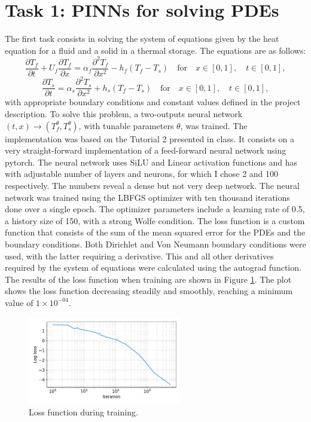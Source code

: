 \documentclass[unicode,11pt,a4paper,oneside,numbers=endperiod,openany]{scrartcl}
\begin{document}
\section{Task 1:  PINNs for solving PDEs}
The first task consists in solving the system of equations given by the heat
equation for a fluid and a solid in a thermal storage. The equations are as follows:
\begin{equation}
    \frac{\partial T_f}{\partial t} + U_f \frac{\partial T_f}{\partial x} = \alpha_f \frac{\partial^2 T_f}{\partial x^2} - h_f(T_f - T_s) \quad \text{for} \quad x \in [0, 1], \quad t \in [0, 1],
\end{equation}
\begin{equation}
     \frac{\partial T_s}{\partial t} = \alpha_s \frac{\partial^2 T_s}{\partial x^2} + h_s(T_f - T_s) \quad \text{for} \quad x \in [0, 1], \quad t \in [0, 1],
\end{equation}
with appropriate boundary conditions and constant values defined in the project description.
To solve this problem, a two-outputs neural network $(t,x) \to
(T^{\theta}_f,T^{\theta}_s)$, with tunable parameters $\theta$, was trained.
The implementation was based on the Tutorial 2 presented in class. It consists on a
very straight-forward implementation of a feed-forward neural network using
pytorch. 
The neural network uses SiLU and Linear activation functions and has with adjustable
number of layers and neurons, for which I chose 2 and 100 respectively. The numbers
reveal a dense but not very deep network.
The neural network was trained using the LBFGS optimizer with ten thousand
iterations done over a single epoch. The optimizer parameters include a learning rate 
of 0.5, a history size of 150, with a strong Wolfe condition. The loss
function is a custom function that consists of the sum of the mean squared
error for the PDEs and the boundary conditions. 
Both Dirichlet and Von Neumann boundary conditions were used, with the latter
requiring a derivative. This and all other derivatives required by the system of
equations were calculated using the autograd function.
The results of the loss function when training are shown in Figure
\ref{fig:task1_loss}. The plot shows the loss function decreasing steadily and
smoothly, reaching a minimum value of $1\times 10^{-04}$.
\begin{figure}[h]
    \centering
    \includegraphics[width=0.6\textwidth]{../Proj1_Y24/Task1/loss.pdf}
    \caption{Loss function during training.}
    \label{fig:task1_loss}
\end{figure}
\end{document}
